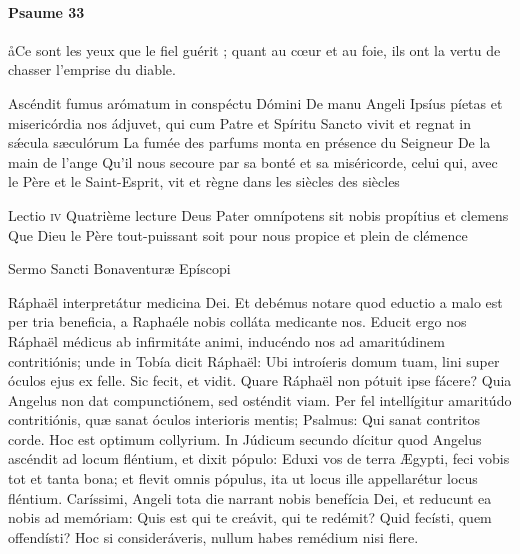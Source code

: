 \documentclass[twoside]{article}
\begin{document}
\begin{paracol}[1]{2}

\begin{enumerate}[wide, itemsep=0mm, labelwidth=!, labelindent=0pt, label=\color{gregoriocolor}\theenumi]

\end{enumerate}

\switchcolumn

\paragraph{Psaume 33}
\aa Ce sont les yeux que le fiel guérit ; quant au cœur et au foie, ils ont la vertu de chasser l’emprise du diable.


\begin{enumerate}[wide, itemsep=0mm, labelwidth=!, labelindent=0pt, label=\color{gregoriocolor}\theenumi]


\end{enumerate}

\switchcolumn*

\versiculusabsolutio
	{Ascéndit fumus arómatum in conspéctu Dómini}
	{De manu Angeli}
	{Ipsíus píetas et misericórdia nos ádjuvet, qui cum Patre et Spíritu Sancto vivit et regnat in sǽcula sæculórum}
	{La fumée des parfums monta en présence du Seigneur}
	{De la main de l’ange}
	{Qu'il nous secoure par sa bonté et sa miséricorde, celui qui, avec le Père et le Saint-Esprit, vit et règne dans les siècles des siècles}

\lectioresponsorium
	{Lectio \textsc{iv}}
	{Quatrième lecture}
	{Deus Pater omnípotens sit nobis propítius et clemens}
	{Que Dieu le Père tout-puissant soit pour nous propice et plein de clémence}
	{
		Sermo Sancti Bonaventuræ Epíscopi
		
		Ráphaël interpretátur medicina Dei. Et debémus notare quod eductio a malo est per tria beneficia, a Raphaéle nobis colláta medicante nos. Educit ergo nos Ráphaël médicus ab infirmitáte animi, inducéndo nos ad amaritúdinem contritiónis; unde in Tobía dicit Ráphaël: Ubi introíeris domum tuam, lini super óculos ejus ex felle. Sic fecit, et vidit. Quare Ráphaël non pótuit ipse fácere? Quia Angelus non dat compunctiónem, sed osténdit viam. Per fel intellígitur amaritúdo contritiónis, quæ sanat óculos interioris mentis; Psalmus: Qui sanat contritos corde. Hoc est optimum collyrium. In Júdicum secundo dícitur quod Angelus ascéndit ad locum fléntium, et dixit pópulo: Eduxi vos de terra Ægypti, feci vobis tot et tanta bona; et flevit omnis pópulus, ita ut locus ille appellarétur locus fléntium. Caríssimi, Angeli tota die narrant nobis benefícia Dei, et reducunt ea nobis ad memóriam: Quis est qui te creávit, qui te redémit? Quid fecísti, quem offendísti? Hoc si consideráveris, nullum habes remédium nisi flere.
		
}
\end{paracol}
\end{document}
